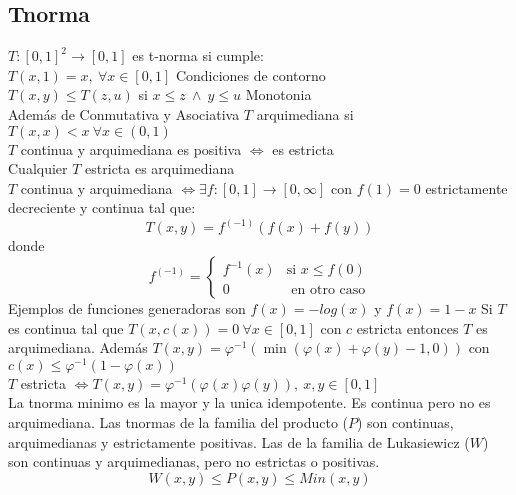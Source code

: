 \documentclass[paper=a4, fontsize=11pt]{scrartcl} %
\begin{document}
\subsection{Tnorma}
$T:[0,1]^2\rightarrow[0,1]$ es t-norma si cumple:\\
$T(x,1)=x,\ \forall x\in[0,1]$ Condiciones de contorno\\ $T(x,y)\leq T(z,u)$ si $x\leq z\ \land\ y\leq u$ Monotonia\\ Además de Conmutativa y Asociativa
\medbreak $T$ arquimediana si $T(x,x)<x\ \forall x \in (0,1)$\\
$T$ continua y arquimediana es positiva $\iff$ es estricta\\
Cualquier $T$ estricta es arquimediana\\
$T$ continua y arquimediana $\iff \exists f:[0,1]\rightarrow[0,\infty]$ con $f(1)=0$ estrictamente decreciente y continua tal que: $$T(x,y)=f^{(-1)}(f(x)+f(y))$$ donde 
$$f^{(-1)}=\begin{cases} f^{-1}(x) & \text{si }x\leq f(0) \\ 0 & \text{ en otro caso}
\end{cases}$$
Ejemplos de funciones generadoras son $f(x)=-log(x)$ y $f(x)=1-x$\medbreak
Si $T$ es continua tal que $T(x,c(x))=0\ \forall x\in [0,1]$ con $c$ estricta entonces $T$ es arquimediana. 
Además $T(x,y)=\varphi^{-1}(\min(\varphi(x)+\varphi(y)-1,0))$ con $c(x) \leq \varphi^{-1}(1-\varphi(x))$\\
$T$ estricta $\iff T(x,y)=\varphi^{-1}(\varphi(x)\varphi(y)),\ x,y\in[0,1]$\\
La tnorma minimo es la mayor y la unica idempotente. Es continua pero no es arquimediana. Las tnormas de la familia del producto ($P$) son continuas, arquimedianas y estrictamente positivas. Las de la familia de Lukasiewicz ($W$) son continuas y arquimedianas, pero no estrictas o positivas.
$$W(x,y)\leq P(x,y) \leq Min(x,y)$$
\end{document}
